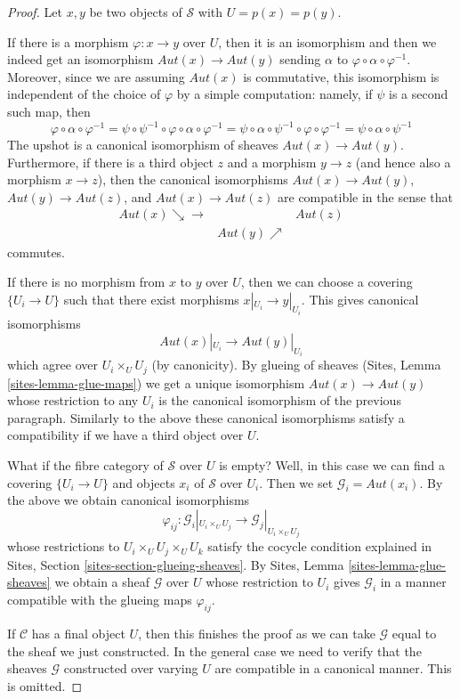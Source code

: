 \begin{proof}
Let $x, y$ be two objects of $\mathcal{S}$ with $U = p(x) = p(y)$.

\medskip\noindent
If there is a morphism $\varphi : x \to y$ over $U$, then it is an
isomorphism and then we indeed get an isomorphism
$\mathit{Aut}(x) \to \mathit{Aut}(y)$ sending
$\alpha$ to $\varphi \circ \alpha \circ \varphi^{-1}$.
Moreover, since we are assuming $\mathit{Aut}(x)$ is
commutative, this isomorphism is independent of the choice
of $\varphi$ by a simple computation: namely, if $\psi$ is
a second such map, then
$$
\varphi \circ \alpha \circ \varphi^{-1} =
\psi \circ \psi^{-1} \circ \varphi \circ \alpha \circ \varphi^{-1} =
\psi \circ \alpha \circ \psi^{-1} \circ \varphi \circ \varphi^{-1} =
\psi \circ \alpha \circ \psi^{-1}
$$
The upshot is a canonical isomorphism of sheaves
$\mathit{Aut}(x) \to \mathit{Aut}(y)$. Furthermore, if there
is a third object $z$ and a morphism $y \to z$ (and hence
also a morphism $x \to z$), then the
canonical isomorphisms $\mathit{Aut}(x) \to \mathit{Aut}(y)$,
$\mathit{Aut}(y) \to \mathit{Aut}(z)$, and
$\mathit{Aut}(x) \to \mathit{Aut}(z)$ are compatible in the sense
that
$$
\begin{array}{ccc}\mathit{Aut}(x) \searrow\longrightarrow &  & \mathit{Aut}(z) \\  & \mathit{Aut}(y) \nearrow & \end{array}
$$
commutes.

\medskip\noindent
If there is no morphism from $x$ to $y$ over $U$, then we can
choose a covering $\{U_i \to U\}$ such that there exist morphisms
$x|_{U_i} \to y|_{U_i}$. This gives canonical isomorphisms
$$
\mathit{Aut}(x)|_{U_i} \longrightarrow \mathit{Aut}(y)|_{U_i}
$$
which agree over $U_i \times_U U_j$ (by canonicity). By glueing of
sheaves (Sites, Lemma \ref{sites-lemma-glue-maps}) we get a unique
isomorphism $\mathit{Aut}(x) \to \mathit{Aut}(y)$ whose restriction
to any $U_i$ is the canonical isomorphism of the previous paragraph.
Similarly to the above these canonical isomorphisms satisfy
a compatibility if we have a third object over $U$.

\medskip\noindent
What if the fibre category of $\mathcal{S}$ over $U$ is empty?
Well, in this case we can find a covering $\{U_i \to U\}$
and objects $x_i$ of $\mathcal{S}$ over $U_i$. Then we set
$\mathcal{G}_i = \mathit{Aut}(x_i)$. By the above we obtain
canonical isomorphisms
$$
\varphi_{ij} :
\mathcal{G}_i|_{U_i \times_U U_j}
\longrightarrow
\mathcal{G}_j|_{U_i \times_U U_j}
$$
whose restrictions to $U_i \times_U U_j \times_U U_k$ satisfy
the cocycle condition explained in Sites, Section
\ref{sites-section-glueing-sheaves}.
By Sites, Lemma \ref{sites-lemma-glue-sheaves}
we obtain a sheaf $\mathcal{G}$ over $U$ whose
restriction to $U_i$ gives $\mathcal{G}_i$
in a manner compatible with the glueing maps $\varphi_{ij}$.

\medskip\noindent
If $\mathcal{C}$ has a final object $U$, then this finishes the proof
as we can take $\mathcal{G}$ equal to the sheaf we just constructed.
In the general case we need to verify that the sheaves $\mathcal{G}$
constructed over varying $U$ are compatible in a canonical manner.
This is omitted.
\end{proof}

